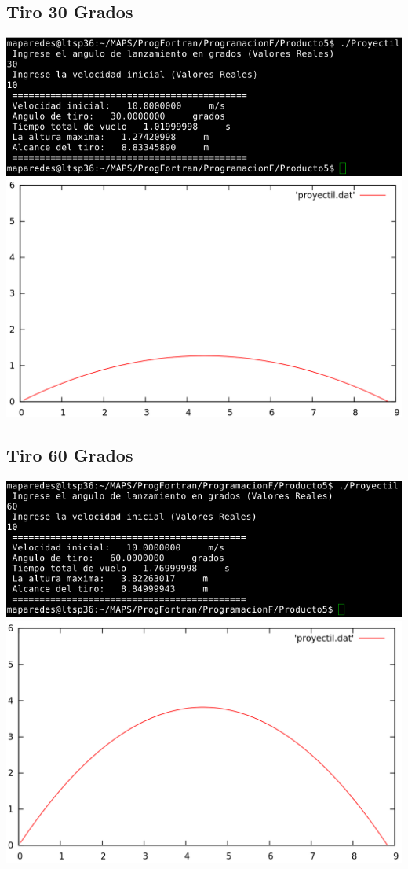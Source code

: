 \documentclass[12pt]{article}
\begin{document}
\subsection{Tiro 30 Grados}
\begin{center}
\includegraphics[width=15cm]{T30.png}
\includegraphics[width=15cm]{Parabolico30.png}
\end{center}
\subsection{Tiro 60 Grados}
\begin{center}
\includegraphics[width=15cm]{T60.png}
\includegraphics[width=15cm]{Parabolico60.png}
\end{center}
\end{document}
